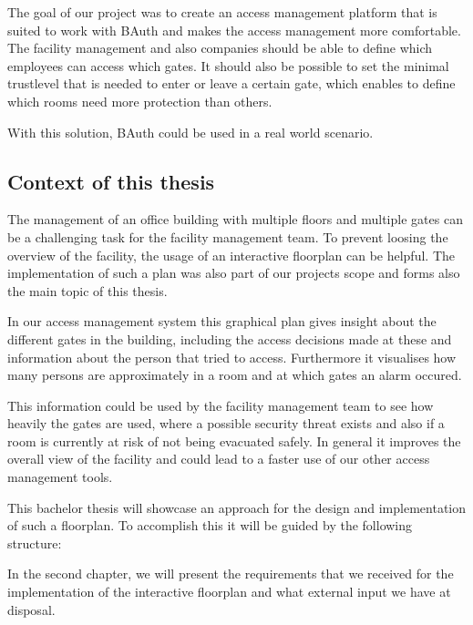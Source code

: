 The goal of our project was to create an access management platform that is suited to work with BAuth and makes the access management more comfortable. The facility management and also companies should be able to define which employees can access which gates. It should also be possible to set the minimal trustlevel that is needed to enter or leave a certain gate, which enables to define which rooms need more protection than others.

With this solution, BAuth could be used in a real world scenario.

\subsection{Context of this thesis}
\label{Context of this thesis}


The management of an office building with multiple floors and multiple gates can be a challenging task for the facility management team. To prevent loosing the overview of the facility, the usage of an interactive floorplan can be helpful. The implementation of such a plan was also part of our projects scope and forms also the main topic of this thesis.

In our access management system this graphical plan gives insight about the different gates in the building, including the access decisions made at these and information about the person that tried to access. Furthermore it visualises how many persons are approximately in a room and at which gates an alarm occured. 

This information could be used by the facility management team to see how heavily the gates are used, where a possible security threat exists and also if a room is currently at risk of not being evacuated safely. 
In general it improves the overall view of the facility and could lead to a faster use of our other access management tools.

This bachelor thesis will showcase an approach for the design and implementation of such a floorplan. To accomplish this it will be guided by the following structure:

In the second chapter, we will present the requirements that we received for the implementation of the interactive floorplan and what external input we have at disposal.

